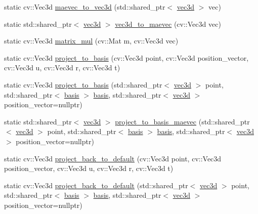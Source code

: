 \begin{DoxyCompactItemize}
\item 
static cv\-::\-Vec3d \hyperlink{classmae_1_1math_1_1internal__math_abeeed99c416811cc057af3bb2cc22b52}{maevec\-\_\-to\-\_\-vec3d} (std\-::shared\-\_\-ptr$<$ \hyperlink{classmae_1_1math_1_1vec3d}{vec3d} $>$ vec)
\item 
static std\-::shared\-\_\-ptr$<$ \hyperlink{classmae_1_1math_1_1vec3d}{vec3d} $>$ \hyperlink{classmae_1_1math_1_1internal__math_a937ff05fc0c169118947da9e67dd54c6}{vec3d\-\_\-to\-\_\-maevec} (cv\-::\-Vec3d vec)
\item 
static cv\-::\-Vec3d \hyperlink{classmae_1_1math_1_1internal__math_ad145b53162f77a8e0ce5763066eb4996}{matrix\-\_\-mul} (cv\-::\-Mat m, cv\-::\-Vec3d vec)
\item 
static cv\-::\-Vec3d \hyperlink{classmae_1_1math_1_1internal__math_acc3d5cb8dc6653ddb2c39298160845f2}{project\-\_\-to\-\_\-basis} (cv\-::\-Vec3d point, cv\-::\-Vec3d position\-\_\-vector, cv\-::\-Vec3d u, cv\-::\-Vec3d r, cv\-::\-Vec3d t)
\item 
static cv\-::\-Vec3d \hyperlink{classmae_1_1math_1_1internal__math_acf0985b80d73225282567694808f7421}{project\-\_\-to\-\_\-basis} (std\-::shared\-\_\-ptr$<$ \hyperlink{classmae_1_1math_1_1vec3d}{vec3d} $>$ point, std\-::shared\-\_\-ptr$<$ \hyperlink{classmae_1_1math_1_1basis}{basis} $>$ \hyperlink{classmae_1_1math_1_1basis}{basis}, std\-::shared\-\_\-ptr$<$ \hyperlink{classmae_1_1math_1_1vec3d}{vec3d} $>$ position\-\_\-vector=nullptr)
\item 
static std\-::shared\-\_\-ptr$<$ \hyperlink{classmae_1_1math_1_1vec3d}{vec3d} $>$ \hyperlink{classmae_1_1math_1_1internal__math_a424494fd9e15878e1fbbe678866e5ce0}{project\-\_\-to\-\_\-basis\-\_\-maevec} (std\-::shared\-\_\-ptr$<$ \hyperlink{classmae_1_1math_1_1vec3d}{vec3d} $>$ point, std\-::shared\-\_\-ptr$<$ \hyperlink{classmae_1_1math_1_1basis}{basis} $>$ \hyperlink{classmae_1_1math_1_1basis}{basis}, std\-::shared\-\_\-ptr$<$ \hyperlink{classmae_1_1math_1_1vec3d}{vec3d} $>$ position\-\_\-vector=nullptr)
\item 
static cv\-::\-Vec3d \hyperlink{classmae_1_1math_1_1internal__math_a028fcc0eb89e368c96d997e43c957369}{project\-\_\-back\-\_\-to\-\_\-default} (cv\-::\-Vec3d point, cv\-::\-Vec3d position\-\_\-vector, cv\-::\-Vec3d u, cv\-::\-Vec3d r, cv\-::\-Vec3d t)
\item 
static cv\-::\-Vec3d \hyperlink{classmae_1_1math_1_1internal__math_a5e3f5cb8a7bf65736a60323b8ff1ccaa}{project\-\_\-back\-\_\-to\-\_\-default} (std\-::shared\-\_\-ptr$<$ \hyperlink{classmae_1_1math_1_1vec3d}{vec3d} $>$ point, std\-::shared\-\_\-ptr$<$ \hyperlink{classmae_1_1math_1_1basis}{basis} $>$ \hyperlink{classmae_1_1math_1_1basis}{basis}, std\-::shared\-\_\-ptr$<$ \hyperlink{classmae_1_1math_1_1vec3d}{vec3d} $>$ position\-\_\-vector=nullptr)

\end{DoxyCompactItemize}
